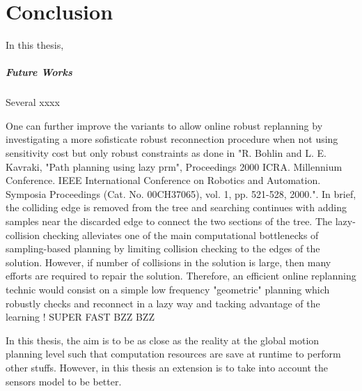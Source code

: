 \chapter{Conclusion}

\glsresetall

In this thesis, 

\paragraph{Future Works} Several xxxx 

One can further improve the  variants to allow online robust replanning by investigating a more sofisticate robust reconnection procedure when not using sensitivity cost but only robust constraints as done in "R. Bohlin and L. E. Kavraki, "Path planning using lazy prm", Proceedings 2000 ICRA. Millennium Conference. IEEE International Conference on Robotics and Automation. Symposia Proceedings (Cat. No. 00CH37065), vol. 1, pp. 521-528, 2000.".
In brief, the colliding edge is removed from the tree and searching continues with adding samples near the discarded edge to connect the two sections of the tree. The lazy-collision checking alleviates one of the main computational bottlenecks of sampling-based planning by limiting collision checking to the edges of the solution. 
However, if number of collisions in the solution is large, then many efforts are required to repair the solution. 
Therefore, an efficient online replanning technic would consist on a simple low frequency "geometric" planning which robustly checks and reconnect in a lazy way and tacking advantage of the learning ! SUPER FAST BZZ BZZ 

In this thesis, the aim is to be as close as the reality at the global motion planning level such that computation resources are save at runtime to perform other stuffs.
However, in this thesis an extension is to take into account the sensors model to be better.